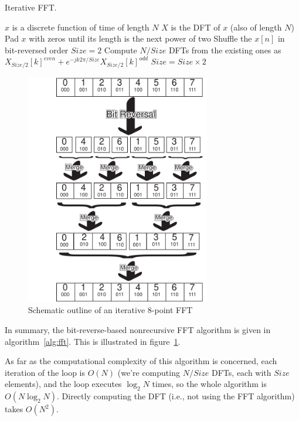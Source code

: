 \begin{algorithm}
\caption{Iterative FFT.\label{alg:fft}}
\begin{algorithmic}
\REQUIRE $x$ is a discrete function of time of length $N$
\ENSURE $X$ is the DFT of $x$ (also of length $N$)
   \STATE Pad $x$ with zeros until its length is the next power of two
\ENDIF
\STATE Shuffle the $x[n]$ in bit-reversed order
\STATE $\mathit{Size} = 2$ 
   \STATE Compute $N/\mathit{Size}$ DFTs from the existing ones as
          $X_{\mathit{Size}/2}[k]^{\mathit{even}} +
          e^{-jk2\pi/\mathit{Size}}X_{\mathit{Size}/2}[k]^{\mathit{odd}}$
   \STATE $\mathit{Size} = \mathit{Size} \times 2$
\ENDWHILE
\end{algorithmic}
\end{algorithm}

\begin{figure}
\centerline{\includegraphics[height=4in]{ch-fft/fft-iterative}}
\caption{Schematic outline of an iterative 8-point FFT
\label{fg:fft-iterative}}
\end{figure}

In summary, the bit-reverse-based nonrecursive FFT algorithm is given
in algorithm~\ref{alg:fft}. This is illustrated in
figure~\ref{fg:fft-iterative}.

As far as the computational complexity of this algorithm is concerned,
each iteration of the loop is $O(N)$ (we're computing
$N/\mathit{Size}$ DFTs, each with $\mathit{Size}$ elements), and the
loop executes $\log_2N$ times, so the whole algorithm is
$O(N\log_2N)$.  Directly computing the DFT (i.e., not using the FFT
algorithm) takes $O(N^2)$.

